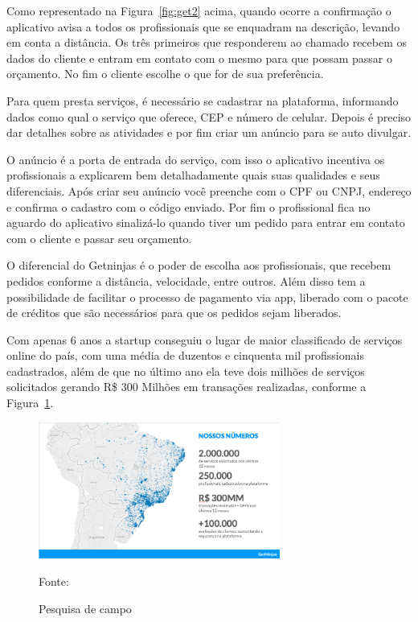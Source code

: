 Como representado na Figura~\hypersetup{linkcolor=black}\ref{fig:get2} acima, quando ocorre a confirmação o aplicativo avisa a todos os profissionais que se enquadram na descrição, levando em conta a distância. Os três primeiros que responderem ao chamado recebem os dados do cliente e entram em contato com o mesmo para que possam passar o orçamento. No fim o cliente escolhe o que for de sua preferência.

Para quem presta serviços, é necessário se cadastrar na plataforma, informando dados como qual o serviço que oferece, CEP e número de celular. Depois é preciso dar detalhes sobre as atividades e por fim criar um anúncio para se auto divulgar.

O anúncio é a porta de entrada do serviço, com isso o aplicativo incentiva os profissionais a explicarem bem detalhadamente quais suas qualidades e seus diferenciais. Após criar seu anúncio você preenche com o CPF ou CNPJ, endereço e confirma o cadastro com o código enviado. Por fim o profissional fica no aguardo do aplicativo sinalizá-lo quando tiver um pedido para entrar em contato com o cliente e passar seu orçamento.

O diferencial do Getninjas é o poder de escolha aos profissionais, que recebem pedidos conforme a distância, velocidade, entre outros. Além disso tem a possibilidade de facilitar o processo de pagamento via app, liberado com o pacote de créditos que são necessários para que os pedidos sejam liberados.


Com apenas 6 anos a startup conseguiu o lugar de maior classificado de serviços online do país, com uma média de duzentos e cinquenta mil profissionais cadastrados, além de que no último ano ela teve dois milhões de serviços solicitados gerando R\$ 300 Milhões em transações realizadas, conforme a Figura~\hypersetup{linkcolor=black}\ref{fig:Pesquisa}.

\begin{figure}[!h]
	\centering
	
	\caption{Pesquisa de campo}
	\includegraphics[width=300px, height=170px]{./images/getNinjasMobile.png}
	\label{fig:Pesquisa}
	\par {Fonte: \cite{get-ninjasMobile}}
\end{figure}



